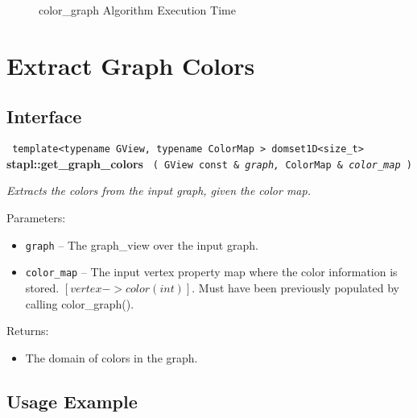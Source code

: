 \begin{figure}[p]
\caption{ color\_graph Algorithm Execution Time}
\label{fig:color-graf-alg-exec-exper}
\end{figure}


\section{ Extract Graph Colors}
\label{sec-get-graf-color-alg}

\subsection{Interface} \label{sec-get-graf-color-alg-inter}

\noindent
\texttt{%
template<typename GView, typename ColorMap >
\newline
domset1D<size\_t> 
}
\newline
\textbf{stapl::get\_graph\_colors}%
\newline
\texttt{%
(
GView const \&
\textit{graph,}%
ColorMap \&
\textit{color\_map}%
)     
}
\vspace{0.4cm}

\textit{
Extracts the colors from the input graph, given the color map.
}
\vspace{0.4cm}

Parameters:
\begin{itemize}
\item
\texttt{graph} --
The graph\_view over the input graph.
\item
\texttt{color\_map} --
The input vertex property map where the color information is stored. 
$[vertex->color (int)].$ 
Must have been previously populated by calling color\_graph().
\end{itemize}

Returns:
\begin{itemize}
\item
The domain of colors in the graph. 
\end{itemize}

\subsection{Usage Example} \label{sec-get-graf-color-alg-use}

